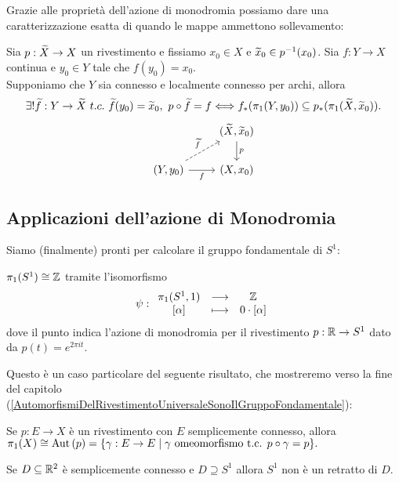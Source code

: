 \begin{multicols*}{2}
Grazie alle propriet\`a dell'azione di monodromia possiamo dare una caratterizzazione esatta di quando le mappe ammettono sollevamento:
\begin{theorem}\label{SollevamentoMappeQualsiasi}
Sia $p:\widetilde{X}\to X$ un rivestimento e fissiamo $x_0\in X$ e $\widetilde{x}_0\in p^{-1}(x_0)$. Sia $f:Y\to X$ continua e $y_0\in Y$ tale che $f(y_0)=x_0$.\\
Supponiamo che $Y$ sia connesso e localmente connesso per archi, allora \[\exists !\widetilde{f}:Y\to \widetilde{X}\ t.c.\ \widetilde{f}(y_0)=\widetilde{x}_0,\ p\circ \widetilde{f}=f\Longleftrightarrow f_\ast(\pi_1(Y,y_0))\subseteq p_\ast(\pi_1(\widetilde{X},\widetilde{x}_0)).\]
\[\begin{tikzcd}
	& {(\wt X,\wt x_0)} \\
	{(Y,y_0)} & {(X,x_0)}
	\arrow["p", from=1-2, to=2-2]
	\arrow["f"', from=2-1, to=2-2]
	\arrow["{\wt f}", dashed, from=2-1, to=1-2]
\end{tikzcd}\]
\end{theorem}








\subsection{Applicazioni dell'azione di Monodromia}
Siamo (finalmente) pronti per calcolare il gruppo fondamentale di $S^1$:
\begin{theorem}\label{GruppoFondamentaleCerchio}
$\pi_1(S^1)\cong \mathbb{Z}$ tramite l'isomorfismo
\[\psi:\begin{array}{ccc} {\pi_1(S^1,1)} & \longrightarrow & {\mathbb{Z}}\\ {[\alpha]} & \longmapsto & {0\cdot [\alpha]} \end{array}\]
dove il punto indica l'azione di monodromia per il rivestimento $p:\mathbb{R}\to S^1$ dato da $p(t)=e^{2\pi it}$.
\end{theorem}
\begin{remark}\label{SeSpazioCompletoSemplicementeConnessoAlloraGruppoFondamentaleIsomorfoAIsomorfismi}
Questo è un caso particolare del seguente risultato, che mostreremo verso la fine del capitolo (\ref{AutomorfismiDelRivestimentoUniversaleSonoIlGruppoFondamentale}):
\begin{center}
Se $p:E\to X$ è un rivestimento con $E$ semplicemente connesso, allora $\pi_1(X)\cong \mathrm{Aut}\,(p)=\{\gamma:E\to E\mid \gamma\text{ omeomorfismo t.c. }p\circ\gamma=p\}.$
\end{center}
\end{remark}

\begin{corollary}
Se $D\subseteq\mathbb{R}^2$ è semplicemente connesso e $D\supseteq S^1$ allora $S^1$ non è un retratto di $D$.
\end{corollary}



\end{multicols*}
